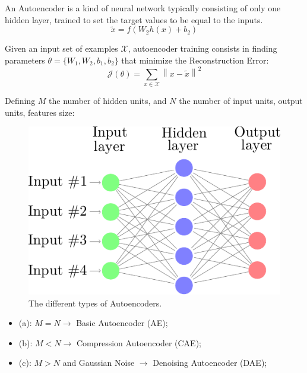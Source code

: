 An Autoencoder is a kind of neural network typically consisting of only one hidden layer, trained to set the target values to be equal to the inputs.
\begin{equation} %
\tilde{x} = f(W_{2}h(x) +b_{2})
\end{equation}



Given an input set of examples $\mathcal{X}$, autoencoder training consists
in finding parameters $\theta=\{W_{1},W_{2},b_{1},b_{2}\}$ that
minimize the Reconstruction Error:
\begin{equation}\label{eq:obAE}
\mathcal{J}(\theta)=\sum_{x\in{\mathcal{X}}}\left\| x - \tilde{x}\right\|^{2}
\end{equation}

Defining $M$ the number of hidden units, and $N$ the number of input units, output units, features size:

\begin{figure}
	\centering
	\includegraphics[width=0.7\columnwidth]{img/autoencoder}
	\caption{The different types of Autoencoders.}
	\label{fig:backg:dnn:AE}
\end{figure}

\begin{itemize}
	\item (a):  $M=N \rightarrow$ Basic Autoencoder (AE);
	\item (b):  $M<N \rightarrow$ Compression Autoencoder (CAE);
	\item (c):  $M>N$ and Gaussian Noise $\rightarrow$ Denoising Autoencoder (DAE);
\end{itemize}



